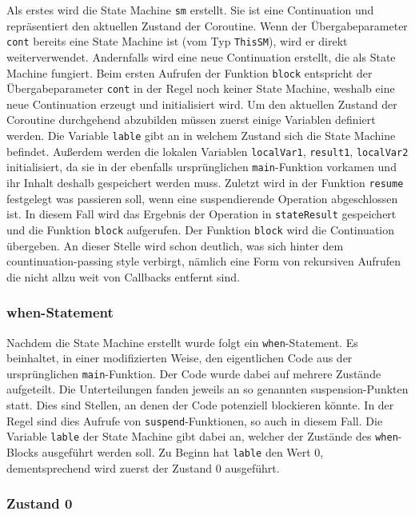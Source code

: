 \documentclass[fontsize=12pt,paper=a4,twoside=semi,parskip=half-,headsepline,headinclude]{scrreprt}
\begin{document}
Als erstes wird die State Machine \texttt{sm} erstellt. Sie ist eine Continuation und repräsentiert den aktuellen Zustand der Coroutine\cite{Elizarov2021}. Wenn der Übergabeparameter \texttt{cont} bereits eine State Machine ist (vom Typ \texttt{ThisSM}), wird er direkt weiterverwendet. Andernfalls wird eine neue Continuation erstellt, die als State Machine fungiert. Beim ersten Aufrufen der Funktion \texttt{block} entspricht der Übergabeparameter \texttt{cont} in der Regel noch keiner State Machine, weshalb eine neue Continuation erzeugt und initialisiert wird. Um den aktuellen Zustand der Coroutine durchgehend abzubilden müssen zuerst einige Variablen definiert werden.  Die Variable \texttt{lable} gibt an in welchem Zustand sich die State Machine befindet. Außerdem werden die lokalen Variablen \texttt{localVar1}, \texttt{result1}, \texttt{localVar2} initialisiert, da sie in der ebenfalls ursprünglichen \texttt{main}-Funktion vorkamen und ihr Inhalt deshalb gespeichert werden muss. Zuletzt wird in der Funktion \texttt{resume} festgelegt was passieren soll, wenn eine suspendierende Operation abgeschlossen ist. In diesem Fall wird das Ergebnis der Operation in \texttt{stateResult} gespeichert und die Funktion \texttt{block} aufgerufen. Der Funktion \texttt{block} wird die Continuation übergeben. An dieser Stelle wird schon deutlich, was sich hinter dem countinuation-passing style verbirgt, nämlich eine Form von rekursiven Aufrufen die nicht allzu weit von Callbacks entfernt sind.

\subsubsection{when-Statement}

Nachdem die State Machine erstellt wurde folgt ein \texttt{when}-Statement. Es beinhaltet, in einer modifizierten Weise, den eigentlichen Code aus der ursprünglichen \texttt{main}-Funktion. Der Code wurde dabei auf mehrere Zustände aufgeteilt. Die Unterteilungen fanden jeweils an so genannten suspension-Punkten statt. Dies sind Stellen, an denen der Code potenziell blockieren könnte. In der Regel sind dies Aufrufe von \texttt{suspend}-Funktionen, so auch in diesem Fall. Die Variable \texttt{lable} der State Machine gibt dabei an, welcher der Zustände des \texttt{when}-Blocks ausgeführt werden soll. Zu Beginn hat \texttt{lable} den Wert 0, dementsprechend wird zuerst der Zustand 0 ausgeführt. 

\subsubsection{Zustand 0}
\end{document}
